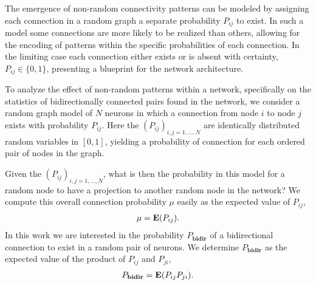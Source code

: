 






The emergence of non-random connectivity patterns can be modeled by assigning each connection in a random graph a separate probability $P_{ij}$ to exist. In such a model some connections are more likely to be realized than others, allowing for the encoding of patterns within the specific probabilities of each connection. In the limiting case each connection either exists or is absent with certainty, $P_{ij} \in \{0,1\}$, presenting a blueprint for the network architecture.

To analyze the effect of non-random patterns within a network, specifically on the statistics of bidirectionally connected pairs found in the network, we consider a random graph model of $N$ neurons in which a connection from node $i$ to node $j$ exists with probability $P_{ij}$. Here the $(P_{ij})_{i,j=1,\dots,N}$ are identically distributed random variables in $[0,1]$, yielding a probability of connection for each ordered pair of nodes in the graph.  

Given the $(P_{ij})_{i,j=1,\dots,N}$, what is then the probability in this model for a random node to have a projection to another random node in the network? We compute this overall connection probability $\mu$ easily as the expected value of $P_{ij}$,
\begin{align}
\mu = \operatorname{\mathbf{E}}(P_{ij}).
\end{align}
%
%
%
In this work we are interested in the probability $P_{\mathbf{bidir}}$ of a bidirectional connection to exist in a random pair of neurons. We determine $P_{\mathbf{bidir}}$ as the expected value of the product of $P_{ij}$ and $P_{ji}$,
%
\begin{align}
P_{\mathbf{bidir}} = \operatorname{\mathbf{E}}(P_{ij} P_{ji}).
\end{align}
%

